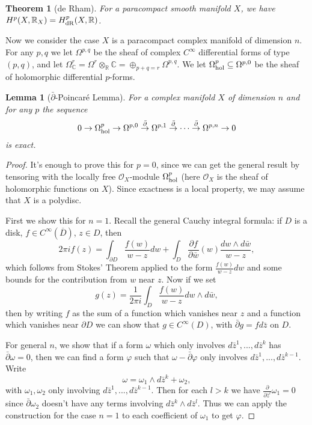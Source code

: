 \documentclass[letterpaper,11pt]{article}
\newtheorem{thm}{Theorem}
\newtheorem{lem}{Lemma}
\theoremstyle{definition}
\theoremstyle{remark}
\begin{document}
\begin{thm}[de Rham] For a paracompact smooth manifold $X$, we have $H^p(X,\mathbb{R}_X) = H^p_{\rm dR}(X,\mathbb{R})$.
\end{thm}

Now we consider the case $X$ is a paracompact complex manifold of dimension $n$. For any $p,q$ we let $\Omega^{p,q}$ be the sheaf of complex $C^\infty$ differential forms of type $(p,q)$, and let $\Omega^r_\mathbb{C} = \Omega^r\otimes_\mathbb{R} \mathbb{C} = \oplus_{p+q=r} \Omega^{p,q}$. We let $\Omega^p_{\rm hol} \subseteq \Omega^{p,0}$ be the sheaf of holomorphic differential $p$-forms.

\begin{lem}[$\bar\partial$-Poincar\'{e} Lemma] For a complex manifold $X$ of dimension $n$ and for any $p$ the sequence
\[
0 \rightarrow \Omega^p_{\rm hol} \rightarrow \Omega^{p,0} \stackrel{\bar\partial}{\rightarrow} \Omega^{p,1} \stackrel{\bar\partial}{\rightarrow} \cdots \stackrel{\bar\partial}{\rightarrow} \Omega^{p,n} \rightarrow 0
\]
is exact.
\end{lem}
\begin{proof} It's enough to prove this for $p=0$, since we can get the general result by tensoring with the locally free $\mathcal{O}_X$-module $\Omega^p_{\rm hol}$ (here $\mathcal{O}_X$ is the sheaf of holomorphic functions on $X$). Since exactness is a local property, we may assume that $X$ is a polydisc.

First we show this for $n=1$. Recall the general Cauchy integral formula: if $D$ is a disk, $f\in C^\infty(\overline{D})$, $z\in D$, then
\[
2\pi if(z) = \int_{\partial D} \frac{f(w)}{w-z}dw + \int_D \frac{\partial f}{\partial \bar{w}}(w)\frac{dw\wedge d\bar{w}}{w-z},
\]
which follows from Stokes' Theorem applied to the form $\frac{f(w)}{w-z}dw$ and some bounds for the contribution from $w$ near $z$. Now if we set
\[
g(z) = \frac{1}{2\pi i}\int_D \frac{f(w)}{w-z}dw\wedge d\bar{w},
\]
then by writing $f$ as the sum of a function which vanishes near $z$ and a function which vanishes near $\partial D$ we can show that $g \in C^\infty(D)$, with $\bar\partial g = fd\bar{z}$ on $D$.

For general $n$, we show that if a form $\omega$ which only involves $d\bar{z}^1, ..., d\bar{z}^k$ has $\bar\partial \omega = 0$, then we can find a form $\varphi$ such that $\omega - \bar\partial\varphi$ only involves $d\bar{z}^1, ..., d\bar{z}^{k-1}$. Write
\[
\omega = \omega_1\wedge d\bar{z}^k + \omega_2,
\]
with $\omega_1, \omega_2$ only involving $d\bar{z}^1, ..., d\bar{z}^{k-1}$. Then for each $l > k$ we have $\frac{\partial}{\partial \bar{z}^l} \omega_1 = 0$ since $\bar\partial \omega_2$ doesn't have any terms involving $d\bar{z}^k\wedge d\bar{z}^l$. Thus we can apply the construction for the case $n=1$ to each coefficient of $\omega_1$ to get $\varphi$.
\end{proof}
\end{document}
